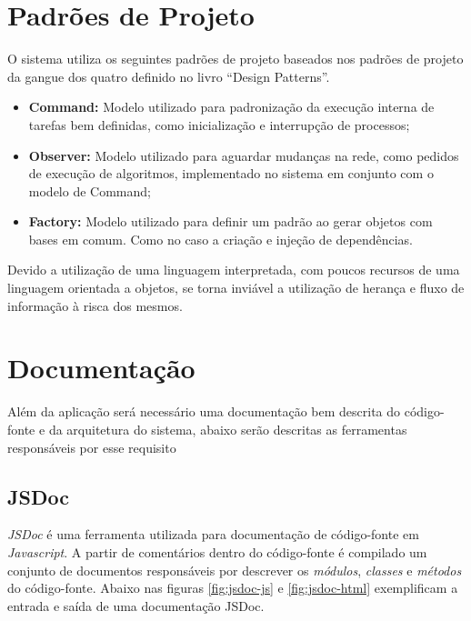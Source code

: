 \section{Padrões de Projeto}
O sistema utiliza os seguintes padrões de projeto baseados nos padrões de projeto da gangue
dos quatro definido no livro ``Design Patterns''.

\begin{itemize}
  \item \textbf{Command:} Modelo utilizado para padronização da execução interna
  de tarefas bem definidas, como inicialização e interrupção de processos;
  \item \textbf{Observer:} Modelo utilizado para aguardar mudanças na rede, como
  pedidos de execução de algoritmos, implementado no sistema em conjunto com o
  modelo de Command;
  \item \textbf{Factory:} Modelo utilizado para definir um padrão ao gerar
  objetos com bases em comum. Como no caso a criação e injeção de dependências.
\end{itemize}


Devido a utilização de uma linguagem interpretada, com poucos recursos de uma
linguagem orientada a objetos, se torna inviável a utilização de herança e fluxo
de informação à risca dos mesmos.

\section{Documentação}
Além da aplicação será necessário uma documentação bem descrita do código-fonte
e da arquitetura do sistema, abaixo serão descritas as ferramentas responsáveis
por esse requisito

\subsection{JSDoc}
\emph{JSDoc} é uma ferramenta utilizada para documentação de código-fonte em
\emph{Javascript}. A partir de comentários dentro do código-fonte é compilado um
conjunto de documentos responsáveis por descrever os \emph{módulos},
\emph{classes} e \emph{métodos} do código-fonte. Abaixo nas figuras
\ref{fig:jsdoc-js} e \ref{fig:jsdoc-html} exemplificam a entrada e saída de uma
documentação JSDoc.

